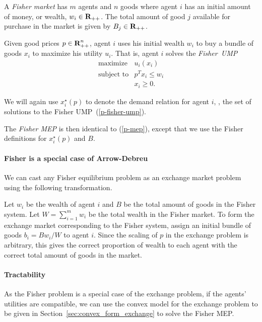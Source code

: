 \documentclass[12pt]{article}
\begin{document}
A \emph{Fisher market} has $m$ agents and $n$ goods where
agent $i$ has an initial amount of money, or wealth, $w_i \in {\mbox{\bf R}}_{++}$.
The total amount of good $j$ available for purchase in the market is given by
$B_j \in {\mbox{\bf R}}_{++}$.

Given good prices $p \in {\mbox{\bf R}}^n_{++}$, agent $i$ uses his initial
wealth $w_i$ to buy a bundle of goods $x_i$ to maximize his utility $u_i$.
That is, agent $i$ solves the \emph{Fisher~UMP}
\begin{equation}
\label{p-fisher-ump}
\begin{array}{ll}
\mbox{maximize} & u_i(x_i) \\
\mbox{subject to} & p^T x_i \leq w_i \\
& x_i \geq 0.
\end{array}
\end{equation}

We will again use $x^\star_i(p)$ to denote the demand relation
for agent $i$, \ie, the set of solutions to the Fisher UMP~(\ref{p-fisher-ump}).

The \emph{Fisher MEP} is then identical to (\ref{p-mep}), except that we use 
the Fisher definitions for $x^\star_i(p)$ and $B$.

\paragraph{Fisher is a special case of Arrow-Debreu}
We can cast any Fisher equilibrium problem as an exchange market problem using the following transformation.

Let $w_i$ be the wealth of agent $i$ and $B$ be the total amount of goods in
the Fisher system.
Let $W = \sum_{i=1}^m w_i$ be the total wealth in the Fisher market.
To form the exchange market corresponding to the Fisher system, assign an initial bundle of goods
$b_i = B w_i/W$ to agent $i$.
Since the scaling of $p$ in the exchange problem is arbitrary,
this gives the correct proportion of wealth to each agent with the correct
total amount of goods in the market.


\paragraph{Tractability}
As the Fisher problem is a special case of the exchange problem,
if the agents' utilities are compatible, we can use the convex model for the
exchange problem
to be given in Section~\ref{sec:convex_form_exchange} to solve
the Fisher MEP.
\end{document}
